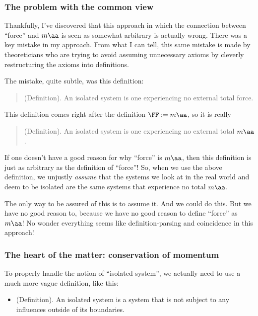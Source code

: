 \documentclass{article}
\begin{document}
\subsubsection*{The problem with the common view}

Thankfully, I've discovered that this approach in which the connection between ``force'' and $m\aa$ is seen as somewhat arbitrary is actually wrong. There was a key mistake in my approach. From what I can tell, this same mistake is made by theoreticians who are trying to avoid assuming unnecessary axioms by cleverly restructuring the axioms into definitions.

The mistake, quite subtle, was this definition:

\begin{quote}
    (Definition). An isolated system is one experiencing no external total force.
\end{quote}

This definition comes right after the definition $\FF := m\aa$, so it is really

\begin{quote}
    (Definition). An isolated system is one experiencing no external total $m\aa$.
\end{quote}

If one doesn't have a good reason for why ``force'' is $m\aa$, then this definition is just as arbitrary as the definition of ``force''! So, when we use the above definition, we unjustly \textit{assume} that the systems we look at in the real world and deem to be isolated are the same systems that experience no total $m\aa$. 

The only way to be assured of this is to assume it. And we could do this. But we have no good reason to, because we have no good reason to define ``force'' as $m\aa$! No wonder everything seems like definition-parsing and coincidence in this approach!

\subsubsection*{The heart of the matter: conservation of momentum}

To properly handle the notion of ``isolated system'', we actually need to use a much more vague definition, like this:

\begin{itemize}
    \item (Definition). An isolated system is a system that is not subject to any influences outside of its boundaries.
\end{itemize}
\end{document}
